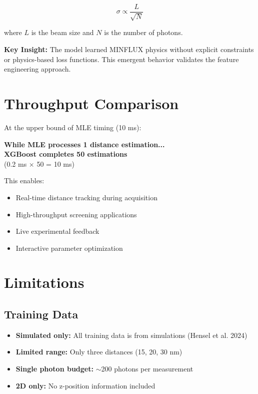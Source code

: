 \documentclass[a4paper,11pt]{article}
\begin{document}
\begin{equation}
\sigma \propto \frac{L}{\sqrt{N}}
\end{equation}

where $L$ is the beam size and $N$ is the number of photons.

\textbf{Key Insight:} The model learned MINFLUX physics without explicit constraints or physics-based loss functions. This emergent behavior validates the feature engineering approach.

\section{Throughput Comparison}

At the upper bound of MLE timing (10 ms):

\begin{center}
\textbf{While MLE processes 1 distance estimation...}\\
\vspace{0.3cm}
\textbf{XGBoost completes 50 estimations}\\
\vspace{0.2cm}
(0.2 ms $\times$ 50 = 10 ms)
\end{center}

This enables:
\begin{itemize}[leftmargin=*]
    \item Real-time distance tracking during acquisition
    \item High-throughput screening applications
    \item Live experimental feedback
    \item Interactive parameter optimization
\end{itemize}

\section{Limitations}

\subsection{Training Data}

\begin{itemize}[leftmargin=*]
    \item \textbf{Simulated only:} All training data is from simulations (Hensel et al. 2024)
    \item \textbf{Limited range:} Only three distances (15, 20, 30 nm)
    \item \textbf{Single photon budget:} $\sim$200 photons per measurement
    \item \textbf{2D only:} No z-position information included
\end{itemize}
\end{document}

